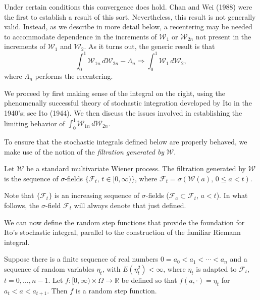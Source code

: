 Under certain conditions this convergence does hold. Chan and Wei (1988) were the first to establish a result of this sort. Nevertheless, this result is not generally valid. Instead, as we describe in more detail below, a recentering may be needed to accommodate dependence in the increments of $\mathcal{W}_1$ or $\mathcal{W}_{2n}$ not present in the increments of $\mathcal{W}_1$ and $\mathcal{W}_2$. As it turns out, the generic result is that
\[
\int_0^1 \mathcal{W}_{1n}\,d\mathcal{W}_{2n} - \Lambda_n \Rightarrow \int_0^1 \mathcal{W}_1\,d\mathcal{W}_2,
\]
where $\Lambda_n$ performs the recentering.

We proceed by first making sense of the integral on the right, using the phenomenally successful theory of stochastic integration developed by Ito in the 1940's; see Ito (1944). We then discuss the issues involved in establishing the limiting behavior of $\int_0^1 \mathcal{W}_{1n}\,d\mathcal{W}_{2n}$.

To ensure that the stochastic integrals defined below are properly behaved, we make use of the notion of the \emph{filtration generated by} $\boldsymbol{\mathcal{W}}$.

\begin{definition}\label{def:filtration-wiener}
Let $\boldsymbol{\mathcal{W}}$ be a standard multivariate Wiener process. The filtration generated by $\boldsymbol{\mathcal{W}}$ is the sequence of $\sigma$-fields $\{\mathcal{F}_t,\, t \in [0,\infty)\}$, where $\mathcal{F}_t = \sigma(\boldsymbol{\mathcal{W}}(a),\, 0 \leq a < t)$.
\end{definition}

Note that $\{\mathcal{F}_t\}$ is an increasing sequence of $\sigma$-fields ($\mathcal{F}_a \subset \mathcal{F}_t$, $a < t$). In what follows, the $\sigma$-field $\mathcal{F}_t$ will always denote that just defined.

We can now define the random step functions that provide the foundation for Ito's stochastic integral, parallel to the construction of the familiar Riemann integral.

\begin{definition}\label{def:random-step-function}
Suppose there is a finite sequence of real numbers $0 = a_0 < a_1 < \cdots < a_n$ and a sequence of random variables $\eta_t$, with $E(\eta_t^2) < \infty$, where $\eta_t$ is adapted to $\mathcal{F}_t$, $t = 0, \ldots, n-1$. Let $f : [0,\infty) \times \Omega \to \mathbb{R}$ be defined so that $f(a, \cdot) = \eta_t$ for $a_t < a < a_{t+1}$. Then $f$ is a random step function.
\end{definition}

